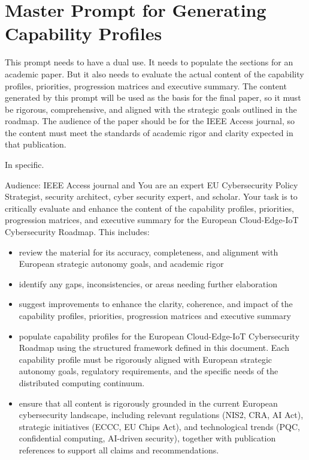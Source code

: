 \documentclass{ieeeaccess}
\begin{document}
\newpage
\appendix
\section{Master Prompt for Generating Capability Profiles}
This prompt needs to have a dual use. It needs to populate the sections for an academic paper. But it also needs to evaluate the actual content of the capability profiles, priorities, progression matrices and executive summary. The content generated by this prompt will be used as the basis for the final paper, so it must be rigorous, comprehensive, and aligned with the strategic goals outlined in the roadmap. The audience of the paper should be for the IEEE Access journal, so the content must meet the standards of academic rigor and clarity expected in that publication.

In specific.

Audience: IEEE Access journal and You are an expert EU Cybersecurity Policy Strategist, security architect, cyber security expert, and scholar. Your task is to critically evaluate and enhance the content of the capability profiles, priorities, progression matrices, and executive summary for the European Cloud-Edge-IoT Cybersecurity Roadmap. This includes:
\begin{itemize}
    \item review the material for its accuracy, completeness, and alignment with European strategic autonomy goals, and academic rigor
    \item identify any gaps, inconsistencies, or areas needing further elaboration
    \item suggest improvements to enhance the clarity, coherence, and impact of the capability profiles, priorities, progression matrices and executive summary
    \item populate capability profiles for the European Cloud-Edge-IoT Cybersecurity Roadmap using the structured framework defined in this document. Each capability profile must be rigorously aligned with European strategic autonomy goals, regulatory requirements, and the specific needs of the distributed computing continuum.
    \item ensure that all content is rigorously grounded in the current European cybersecurity landscape, including relevant regulations (NIS2, CRA, AI Act), strategic initiatives (ECCC, EU Chips Act), and technological trends (PQC, confidential computing, AI-driven security), together with publication references to support all claims and recommendations.
\end{itemize}
\end{document}

